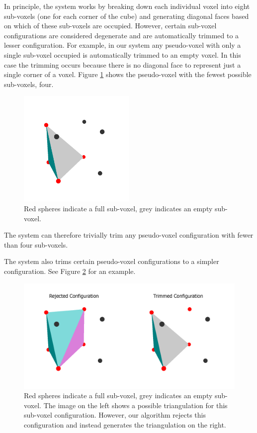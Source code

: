 In principle, the system works by breaking down each individual voxel into eight sub-voxels (one for each corner of the cube) and generating diagonal faces based on which of these sub-voxels are occupied.
However, certain sub-voxel configurations are considered degenerate and are automatically trimmed to a lesser configuration.
For example, in our system any pseudo-voxel with only a single sub-voxel occupied is automatically trimmed to an empty voxel.
In this case the trimming occurs because there is no diagonal face to represent just a single corner of a voxel.
Figure \ref{fig:minimumvoxel} shows the pseudo-voxel with the fewest possible sub-voxels, four.

\begin{figure}
	\centering
		\includegraphics[width=0.5\textwidth]{figures/minimumvoxel.png}
	\caption{Red spheres indicate a full sub-voxel, grey indicates an empty sub-voxel.}
	\label{fig:minimumvoxel}
\end{figure}

The system can therefore trivially trim any pseudo-voxel configuration with fewer than four sub-voxels.

The system also trims certain pseudo-voxel configurations to a simpler configuration.
See Figure \ref{fig:voxelrejected} for an example.

\begin{figure}
	\centering
		\includegraphics[width=1.0\textwidth]{figures/voxelrejected.png}
	\caption{
		Red spheres indicate a full sub-voxel, grey indicates an empty sub-voxel.
		The image on the left shows a possible triangulation for this sub-voxel configuration.
		However, our algorithm rejects this configuration and instead generates the triangulation on the right.
	}
	\label{fig:voxelrejected}
\end{figure}

